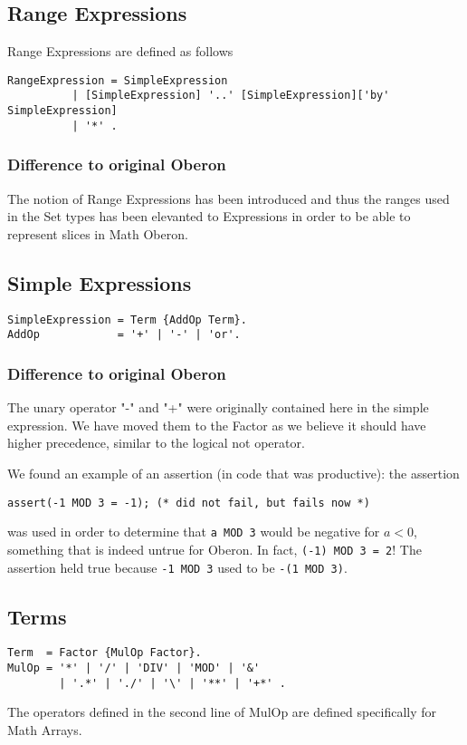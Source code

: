 \documentclass[a4wide,11pt]{article}
\begin{document}
\subsection{Range Expressions}
Range Expressions are defined as follows
\begin{lstlisting}[style=ebnf]
RangeExpression = SimpleExpression
          | [SimpleExpression] '..' [SimpleExpression]['by' SimpleExpression]
          | '*' .
\end{lstlisting}

\subsubsection{Difference to original Oberon}
The notion of Range Expressions has been introduced and thus the ranges used in the Set types has been elevanted to Expressions in order to be able to represent slices in Math Oberon.

\subsection{Simple Expressions}

\begin{lstlisting}[style=ebnf]
SimpleExpression = Term {AddOp Term}.
AddOp            = '+' | '-' | 'or'.
\end{lstlisting}

\begin{annotation}
\subsubsection{Difference to original Oberon}
The unary operator "-" and "+" were originally contained here in the simple expression.
We have moved them to the Factor as we believe it should have higher precedence, similar to the logical not operator.

We found an example of an assertion (in code that was productive): the assertion
\begin{lstlisting}[style=example]
	assert(-1 MOD 3 = -1); (* did not fail, but fails now *)
\end{lstlisting}
was used in order to determine that \lstinline"a MOD 3" would be negative for $a<0$, something that is indeed untrue for Oberon.
In fact, \lstinline"(-1) MOD 3 = 2"!
The assertion held true because \lstinline"-1 MOD 3" used to be \lstinline"-(1 MOD 3)".
\end{annotation}

\subsection{Terms}
\begin{lstlisting}[style=ebnf]
Term  = Factor {MulOp Factor}.
MulOp = '*' | '/' | 'DIV' | 'MOD' | '&'
        | '.*' | './' | '\' | '**' | '+*' .
\end{lstlisting}
The operators defined in the second line of MulOp are defined specifically for Math Arrays.
\end{document}
